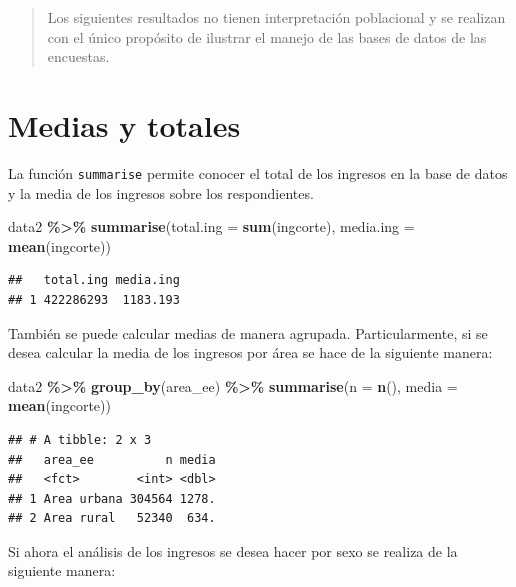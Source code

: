 \documentclass[
  spanish,
  12pt,
]{book}
\newenvironment{Shaded}{\begin{snugshade}}{\end{snugshade}}
\newcommand{\AttributeTok}[1]{\textcolor[rgb]{0.13,0.29,0.53}{#1}}
\newcommand{\FunctionTok}[1]{\textcolor[rgb]{0.13,0.29,0.53}{\textbf{#1}}}
\newcommand{\NormalTok}[1]{#1}
\newcommand{\SpecialCharTok}[1]{\textcolor[rgb]{0.81,0.36,0.00}{\textbf{#1}}}
\begin{document}
\begin{quote}
Los siguientes resultados no tienen interpretación poblacional y se realizan con el único propósito de ilustrar el manejo de las bases de datos de las encuestas.
\end{quote}

\section{Medias y totales}\label{medias-y-totales}

La función \texttt{summarise} permite conocer el total de los ingresos en la base de datos y la media de los ingresos sobre los respondientes.

\begin{Shaded}
\begin{Highlighting}[]
\NormalTok{data2 }\SpecialCharTok{\%\textgreater{}\%} \FunctionTok{summarise}\NormalTok{(}\AttributeTok{total.ing =} \FunctionTok{sum}\NormalTok{(ingcorte),}
                    \AttributeTok{media.ing =} \FunctionTok{mean}\NormalTok{(ingcorte))}
\end{Highlighting}
\end{Shaded}

\begin{verbatim}
##   total.ing media.ing
## 1 422286293  1183.193
\end{verbatim}

También se puede calcular medias de manera agrupada. Particularmente, si se desea calcular la media de los ingresos por área se hace de la siguiente manera:

\begin{Shaded}
\begin{Highlighting}[]
\NormalTok{data2 }\SpecialCharTok{\%\textgreater{}\%} \FunctionTok{group\_by}\NormalTok{(area\_ee) }\SpecialCharTok{\%\textgreater{}\%}
  \FunctionTok{summarise}\NormalTok{(}\AttributeTok{n =} \FunctionTok{n}\NormalTok{(),}
            \AttributeTok{media =} \FunctionTok{mean}\NormalTok{(ingcorte))}
\end{Highlighting}
\end{Shaded}

\begin{verbatim}
## # A tibble: 2 x 3
##   area_ee          n media
##   <fct>        <int> <dbl>
## 1 Area urbana 304564 1278.
## 2 Area rural   52340  634.
\end{verbatim}

Si ahora el análisis de los ingresos se desea hacer por sexo se realiza de la siguiente manera:
\end{document}
